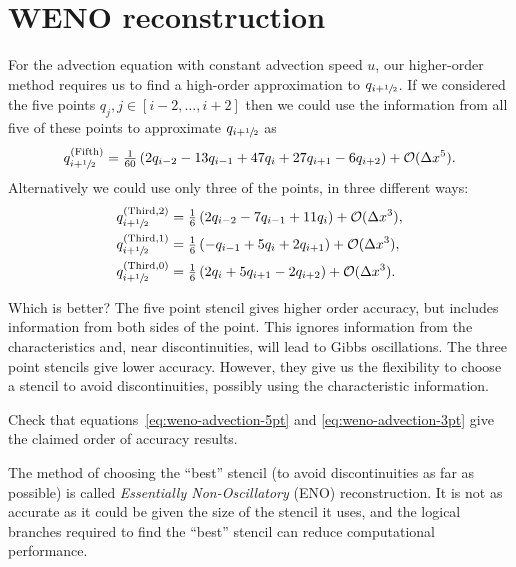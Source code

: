 \section{WENO reconstruction}
\label{sec:WENO}

For the advection equation with constant advection speed $u$, our higher-order
method requires us to find a high-order approximation to $q_{i+{\sfrac{1}{2}}}$. If we
considered the five points $q_{j}, j \in [i-2, \dots, i+2]$ then we could use
the information from all five of these points to approximate $q_{i+{\sfrac{1}{2}}}$ as
\begin{equation}
  \label{eq:weno-advection-5pt}
  q^{(\text{Fifth})}_{i+{\sfrac{1}{2}}} = \tfrac{1}{60} \left( 2 q_{i-2} - 13 q_{i-1} + 47 q_{i} + 27 q_{i+1} - 6 q_{i+2} \right) + {\cal O}(\Delta x^5).
\end{equation}
Alternatively we could use only three of the points, in three different ways:
\begin{subequations}
  \label{eq:weno-advection-3pt}
  \begin{align}
    q^{(\text{Third}, 2)}_{i+{\sfrac{1}{2}}} &= \tfrac{1}{6} \left( 2 q_{i-2} - 7 q_{i-1} + 11 q_{i} \right) + {\cal O}(\Delta x^3), \\
    q^{(\text{Third}, 1)}_{i+{\sfrac{1}{2}}} &= \tfrac{1}{6} \left( -q_{i-1} + 5 q_{i} + 2 q_{i+1} \right) + {\cal O}(\Delta x^3), \\
    q^{(\text{Third}, 0)}_{i+{\sfrac{1}{2}}} &= \tfrac{1}{6} \left( 2 q_{i} + 5 q_{i+1} - 2 q_{i+2} \right) + {\cal O}(\Delta x^3).
  \end{align}
\end{subequations}

Which is better? The five point stencil gives higher order accuracy, but
includes information from both sides of the point. This ignores information from
the characteristics and, near discontinuities, will lead to Gibbs oscillations.
The three point stencils give lower accuracy. However, they give us the
flexibility to choose a stencil to avoid discontinuities, possibly using the
characteristic information.


\begin{exercise}
{Check that equations~\eqref{eq:weno-advection-5pt} and
\eqref{eq:weno-advection-3pt} give the claimed order of accuracy results.}
\end{exercise}

The method of choosing the ``best'' stencil (to avoid discontinuities as far as
possible) is called \emph{Essentially Non-Oscillatory} (ENO) reconstruction. It
is not as accurate as it could be given the size of the stencil it uses, and
the logical branches required to find the ``best'' stencil can reduce
computational performance.


